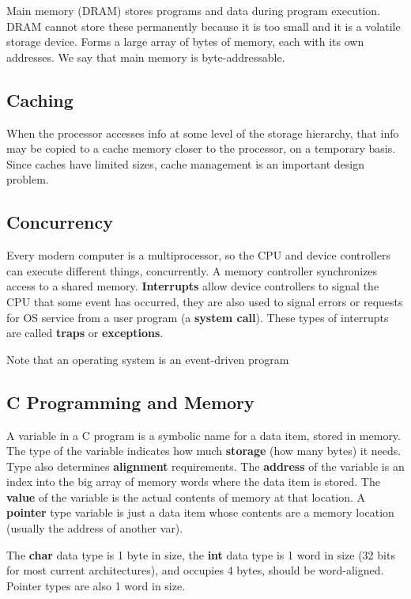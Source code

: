 \documentclass{article}
\begin{document}
Main memory (DRAM) stores programs and data during program execution. DRAM cannot store these permanently because it is too small and it is a volatile storage device. Forms a large array of bytes of memory, each with its own addresses. We say that main memory is byte-addressable.

\subsection{Caching}

When the processor accesses info at some level of the storage hierarchy, that info may be copied to a cache memory closer to the processor, on a temporary basis. Since caches have limited sizes, cache management is an important design problem.

\subsection{Concurrency}

Every modern computer is a multiprocessor, so the CPU and device controllers can execute different things, concurrently. A memory controller synchronizes access to a shared memory. \textbf{Interrupts} allow device controllers to signal the CPU that some event has occurred, they are also used to signal errors or requests for OS service from a user program (a \textbf{system call}). These types of interrupts are called \textbf{traps} or \textbf{exceptions}.

Note that an operating system is an event-driven program

\subsection{C Programming and Memory}

A variable in a C program is a symbolic name for a data item, stored in memory. The type of the variable indicates how much \textbf{storage} (how many bytes) it needs. Type also determines \textbf{alignment} requirements. The \textbf{address} of the variable is an index into the big array of memory words where the data item is stored. The \textbf{value} of the variable is the actual contents of memory at that location. A \textbf{pointer} type variable is just a data item whose contents are a memory location (usually the address of another var).

The \textbf{char} data type is 1 byte in size, the \textbf{int} data type is 1 word in size (32 bits for most current architectures), and occupies 4 bytes, should be word-aligned. Pointer types are also 1 word in size.
\end{document}
